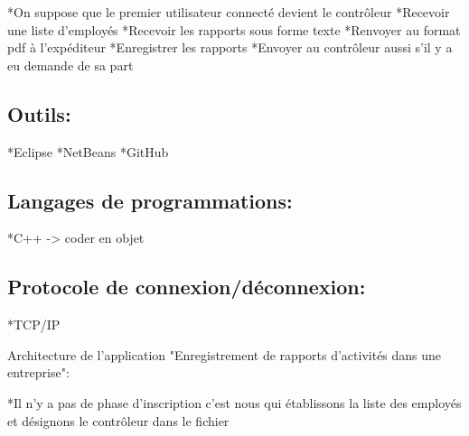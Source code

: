 \begin{DoxyPre}
*On suppose que le premier utilisateur connecté devient le contrôleur
*Recevoir une liste d'employés
*Recevoir les rapports sous forme texte
*Renvoyer au format pdf à l'expéditeur
*Enregistrer les rapports
*Envoyer au contrôleur aussi s'il y a eu demande de sa part\end{DoxyPre}



\begin{DoxyPre}\subsection*{Outils:}\end{DoxyPre}



\begin{DoxyPre}
*Eclipse
*NetBeans
*GitHub\end{DoxyPre}



\begin{DoxyPre}\subsection*{Langages de programmations:}\end{DoxyPre}



\begin{DoxyPre}
*C++ -> coder en objet\end{DoxyPre}



\begin{DoxyPre}\subsection*{Protocole de connexion/déconnexion:}\end{DoxyPre}



\begin{DoxyPre}
*TCP/IP\end{DoxyPre}



\begin{DoxyPre}Architecture  de l'application "Enregistrement de rapports d'activités dans une entreprise":\end{DoxyPre}



\begin{DoxyPre}*Il n'y a pas de phase d'inscription c'est nous qui établissons la liste des employés et désignons le contrôleur dans le fichier\end{DoxyPre}



